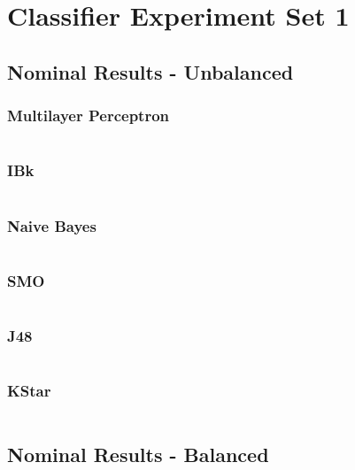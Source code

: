 \section{Classifier Experiment Set 1}
\label{sec:results:cexp1}
\subsection{Nominal Results - Unbalanced}
\subsubsection{Multilayer Perceptron}
\inputminted[fontsize=\footnotesize,breaklines=true]{text}{../data/processed/third/unbalanced/nominal-multilayer-perceptron.txt}
\clearpage

\subsubsection{IBk}
\inputminted[fontsize=\footnotesize,breaklines=true]{text}{../data/processed/third/unbalanced/nominal-ibk-1.txt}
\clearpage

\subsubsection{Naive Bayes}
\inputminted[fontsize=\footnotesize,breaklines=true]{text}{../data/processed/third/unbalanced/nominal-naive-bayes.txt}
\clearpage

\subsubsection{SMO}
\inputminted[fontsize=\footnotesize,breaklines=true]{text}{../data/processed/third/unbalanced/nominal-smo.txt}
\clearpage

\subsubsection{J48}
\inputminted[fontsize=\footnotesize,breaklines=true]{text}{../data/processed/third/unbalanced/nominal-j48.txt}
\clearpage

\subsubsection{KStar}
\inputminted[fontsize=\footnotesize,breaklines=true]{text}{../data/processed/third/unbalanced/nominal-kstar.txt}
\clearpage


\subsection{Nominal Results - Balanced}
